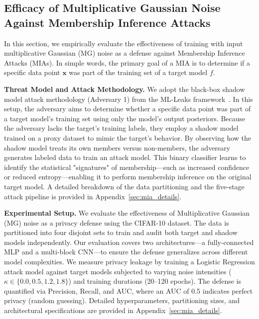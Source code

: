\documentclass[10pt]{article} %
\theoremstyle{definition}
\theoremstyle{plain}
\begin{document}
\subsection{Efficacy of Multiplicative Gaussian Noise Against Membership Inference Attacks}
\label{sec:exp_mia}

In this section, we empirically evaluate the effectiveness of training with input multiplicative Gaussian (MG) noise as a defense against Membership Inference Attacks (MIAs). In simple words, the primary goal of a MIA is to determine if a specific data point $\mathbf{x}$ was part of the training set of a target model $f$.

\noindent \textbf{Threat Model and Attack Methodology.}
We adopt the black-box shadow model attack methodology (Adversary 1) from the ML-Leaks framework~\citep{salem2019mlleaks}. In this setup, the adversary aims to determine whether a specific data point was part of a target model's training set using only the model's output posteriors. Because the adversary lacks the target's training labels, they employ a shadow model trained on a proxy dataset to mimic the target’s behavior. By observing how the shadow model treats its own members versus non-members, the adversary generates labeled data to train an attack model. This binary classifier learns to identify the statistical "signatures" of membership—such as increased confidence or reduced entropy—enabling it to perform membership inference on the original target model. A detailed breakdown of the data partitioning and the five-stage attack pipeline is provided in Appendix~\ref{sec:mia_details}.

\noindent \textbf{Experimental Setup.} 
We evaluate the effectiveness of Multiplicative Gaussian (MG) noise as a privacy defense using the CIFAR-10 dataset. The data is partitioned into four disjoint sets to train and audit both target and shadow models independently. Our evaluation covers two architectures---a fully-connected MLP and a multi-block CNN---to ensure the defense generalizes across different model complexities. We measure privacy leakage by training a Logistic Regression attack model against target models subjected to varying noise intensities ($\kappa \in \{0.0, 0.5, 1.2, 1.8\}$) and training durations (20--120 epochs). The defense is quantified via Precision, Recall, and AUC, where an AUC of 0.5 indicates perfect privacy (random guessing). Detailed hyperparameters, partitioning sizes, and architectural specifications are provided in Appendix~\ref{sec:mia_details}.
\end{document}
